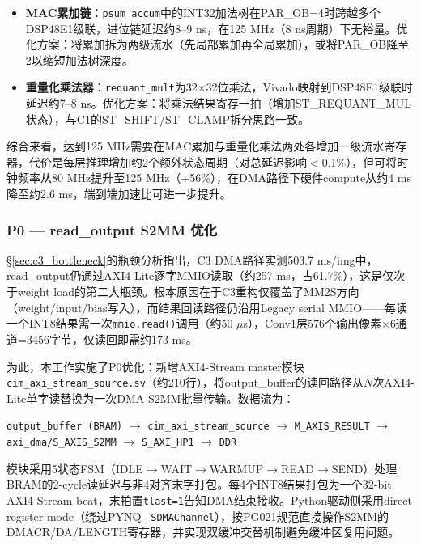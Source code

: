 \documentclass[12pt, a4paper]{article}
\begin{document}
\begin{itemize}
    \item \textbf{MAC累加链}：\texttt{psum\_accum}中的INT32加法树在PAR\_OB=4时跨越多个DSP48E1级联，进位链延迟约8--9 ns，在125 MHz（8 ns周期）下无裕量。优化方案：将累加拆为两级流水（先局部累加再全局累加），或将PAR\_OB降至2以缩短加法树深度。
    \item \textbf{重量化乘法器}：\texttt{requant\_mult}为32×32位乘法，Vivado映射到DSP48E1级联时延迟约7--8 ns。优化方案：将乘法结果寄存一拍（增加ST\_REQUANT\_MUL状态），与C1的ST\_SHIFT/ST\_CLAMP拆分思路一致。
\end{itemize}

综合来看，达到125 MHz需要在MAC累加与重量化乘法两处各增加一级流水寄存器，代价是每层推理增加约2个额外状态周期（对总延迟影响$<$0.1\%），但可将时钟频率从80 MHz提升至125 MHz（+56\%），在DMA路径下硬件compute从约4 ms降至约2.6 ms，端到端加速比可进一步提升。

\subsubsection{P0 — read\_output S2MM 优化}
\label{sec:p0_s2mm}

§\ref{sec:c3_bottleneck}的瓶颈分析指出，C3 DMA路径实测503.7 ms/img中，read\_output仍通过AXI4-Lite逐字MMIO读取（约257 ms，占61.7\%），这是仅次于weight load的第二大瓶颈。根本原因在于C3重构仅覆盖了MM2S方向（weight/input/bias写入），而结果回读路径仍沿用Legacy serial MMIO——每读一个INT8结果需一次\texttt{mmio.read()}调用（约50 $\mu$s），Conv1层576个输出像素$\times$6通道=3456字节，仅读回即需约173 ms。

为此，本工作实施了P0优化：新增AXI4-Stream master模块\texttt{cim\_axi\_stream\_source.sv}（约210行），将output\_buffer的读回路径从$N$次AXI4-Lite单字读替换为一次DMA S2MM批量传输。数据流为：

\begin{center}
\texttt{output\_buffer (BRAM)} $\rightarrow$ \texttt{cim\_axi\_stream\_source} $\rightarrow$ \texttt{M\_AXIS\_RESULT} $\rightarrow$ \texttt{axi\_dma/S\_AXIS\_S2MM} $\rightarrow$ \texttt{S\_AXI\_HP1} $\rightarrow$ \texttt{DDR}
\end{center}

模块采用5状态FSM（IDLE$\rightarrow$WAIT$\rightarrow$WARMUP$\rightarrow$READ$\rightarrow$SEND）处理BRAM的2-cycle读延迟与非4对齐末字打包。每4个INT8结果打包为一个32-bit AXI4-Stream beat，末拍置\texttt{tlast=1}告知DMA结束接收。Python驱动侧采用direct register mode（绕过PYNQ \texttt{\_SDMAChannel}），按PG021规范直接操作S2MM的DMACR/DA/LENGTH寄存器，并实现双缓冲交替机制避免缓冲区复用问题。
\end{document}
